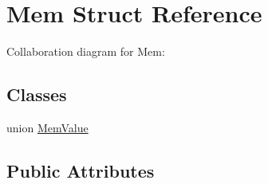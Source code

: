 \hypertarget{struct_mem}{\section{Mem Struct Reference}
\label{struct_mem}
}


Collaboration diagram for Mem\+:
\subsection*{Classes}
\begin{DoxyCompactItemize}
\item 
union \hyperlink{union_mem_1_1_mem_value}{Mem\+Value}
\end{DoxyCompactItemize}
\subsection*{Public Attributes}
